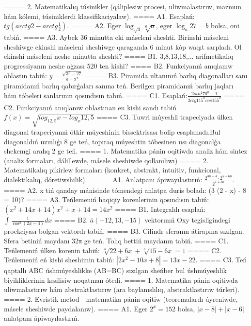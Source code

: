 ====
2. Matematikalıq túsinikler (qáliplesiw procesi, uliwmalastırıw, mazmun hám kólemi, túsiniklerdi klassifikaciyalaw).
====
A1. Esaplań: \(tg\left(arctg2 - arctg\frac{1}{2} \right) \).
====
A2. Eger \(\log_{\sqrt{3}}\sqrt[6]{a}\), eger \(\log_{a}27 = b\) bolsa, oni tabiń.
====
A3. Aybek 36 minutta eki máseleni sheshti. Birinshi máseleni sheshiwge ekinshi máseleni sheshiwge qaraganda 6 minut kóp waqıt sarpladı. Ol ekinshi máseleni neshe minutta sheshti?
====
B1. 3,8,13,18,... arifmetikalıq progressiyanın neshe aģzası 520 ten kishi?
====
B2. Funkciyanıń anıqlanıw oblastın tabiń: \(y = \frac{\sqrt{3^{x} - 27}}{8 - 2^{x}}\)
====
B3. Piramida ultanınıń barlıq diagonalları sanı piramidanıń barlıq qabırǵaları sanına teń. Berilgen piramidanıń barlıq jaqları hám tóbeleri sanlarının qosındısın tabıń.
====
C1. Esaplań:\(\frac{2sin^{2}70^{0} - 1}{2ctg115^{0}cos155^{0}}\)
====
C2. Funkciyanıń anıqlanıw oblastınan en kishi sandı tabiń \(f (x) = \sqrt{log_{12,5}x - log_{x}12,5}\)
====
C3. Tuwri múyeshli trapeciyada úlken diagonal trapeciyanıń ótkir múyeshinin bissektrisası bolip esaplanadı.Bul diagonaldıń uzınlıǵı 8 ge teń, topıraq múyeshtin tóbesinen usı diagonalǵa shekemgi aralıq 2 ge teń.
====
1. Matematika pánin oqitiwda analiz hám sintez (analiz formaları, dálillewde, másele sheshiwde qollanılıwı)
====
2. Matematikalıq pikirlew formaları (konkret, abstrakt, intuitiv, funkcional, dialektikalıq, dóretiwshilik).
====
A1. Anlatpanı ápiwayılastırıń: \(\frac{2^{3n - 4} \cdot 2^{5 + 6n}}{2^{1 + 3n}}\).
====
A2. x tiń qanday mánisinde tómendegi anlatpa duris boladı: (3 (2 - x) - 8 = 10)?
====
A3. Teńlemeniń haqiqiy korenlerinin qosındısın tabiń: \((x^2 + 14x + 14) x^2 + x + 14 = 14x^2\)
====
B1. Integraldı esaplań: \(\int_{}^{}{\frac{1}{\cos^{2} (2x - 3) }dx}\)
====
B2. \(\overline{a} (- 12,13, - 15) \) vektorınıń Oxy tegisligindegi proekciyası bolgan vektordı tabiń.
====
B3. Cilindr sferanın átirapına sızılgan. Sfera betiniń maydanı 32π ge teń. Tolıq bettiń maydanın tabiń.
====
C1. Teńlemeniń úlken korenin tabiń: \(\sqrt[3]{22 + 6x} + \sqrt[3]{15 - 6x} = 1\)
====
C2. Teńlemeniń eń kishi sheshimin tabiń: \(\left| 2x^2 - 10x + 8 \right| = 13x - 22\).
====
C3. Teń qaptallı ABC úshmúyeshlikke (AB=BC) sızılgan sheńber bul úshmúyeshlik biyikliklerinin kesilisiw noqatınan ótedi.
====
1. Matematika pánin oqitiwda uliwmalastırıw hám abstraktlastırıw (ara baylanıslılıq, abstraktlastırıw túrleri).
====
2. Evristik metod - matematika pánin oqitiw (teoremalardı úyreniwde, másele sheshiwde paydalanıw).
====
A1. Eger \(2^{x} = 152\) bolsa, \(|x - 8| + |x - 6|\) anlatpanı ápiwayılastırıń.
